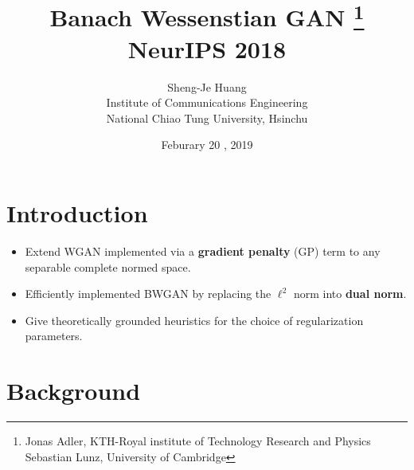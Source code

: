 \documentclass[landscape,headrule,footrule]{foils}
\begin{document}
\title       {Banach Wessenstian GAN
\footnote{Jonas Adler, KTH-Royal institute of Technology Research and Physics \\
Sebastian Lunz, University of Cambridge}
\\[12pt]
\normalsize NeurIPS 2018}

\author      {\large Sheng-Je Huang \\[1em]
              Institute of Communications Engineering \\
              National Chiao Tung University, Hsinchu}
\date        {Feburary 20 , 2019}
\MyLogo      {}
\Restriction {}
\rightfooter {\thepage}
\leftheader  {}
\maketitle
\tableofcontents
\section{Introduction}
\tableofcontents

\begin{frame}[\secname]
\begin{center}
\begin{itemize}
\item Extend WGAN implemented via a \textbf{gradient penalty} (GP) term to any separable complete normed space. \\
\item Efficiently implemented BWGAN by replacing the $\ell^{2}$ norm into \textbf{dual norm}. \\
\item Give theoretically grounded heuristics for the choice of regularization parameters. \\
\end{itemize}
\end{center}
\end{frame}

\section{Background}
\end{document}
